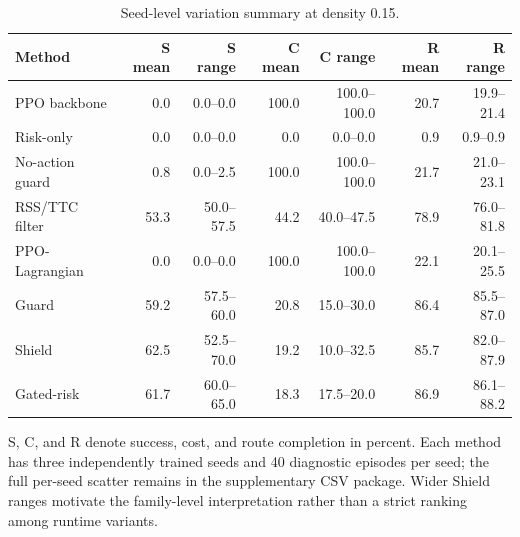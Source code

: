 \begin{table}[!htbp]
\centering
\caption{Seed-level variation summary at density 0.15.}
\label{tab_seed_range}
\scriptsize
\setlength{\tabcolsep}{3.0pt}
\renewcommand{\arraystretch}{1.08}
\begin{tabular}{@{}lrrrrrr@{}}
\toprule
Method & S mean & S range & C mean & C range & R mean & R range \\
\midrule
PPO backbone & 0.0 & 0.0--0.0 & 100.0 & 100.0--100.0 & 20.7 & 19.9--21.4 \\
Risk-only & 0.0 & 0.0--0.0 & 0.0 & 0.0--0.0 & 0.9 & 0.9--0.9 \\
No-action guard & 0.8 & 0.0--2.5 & 100.0 & 100.0--100.0 & 21.7 & 21.0--23.1 \\
RSS/TTC filter & 53.3 & 50.0--57.5 & 44.2 & 40.0--47.5 & 78.9 & 76.0--81.8 \\
PPO-Lagrangian & 0.0 & 0.0--0.0 & 100.0 & 100.0--100.0 & 22.1 & 20.1--25.5 \\
Guard & 59.2 & 57.5--60.0 & 20.8 & 15.0--30.0 & 86.4 & 85.5--87.0 \\
Shield & 62.5 & 52.5--70.0 & 19.2 & 10.0--32.5 & 85.7 & 82.0--87.9 \\
Gated-risk & 61.7 & 60.0--65.0 & 18.3 & 17.5--20.0 & 86.9 & 86.1--88.2 \\
\bottomrule
\end{tabular}
\begin{tablenotes}
\item S, C, and R denote success, cost, and route completion in percent. Each method has three independently trained seeds and 40 diagnostic episodes per seed; the full per-seed scatter remains in the supplementary CSV package. Wider Shield ranges motivate the family-level interpretation rather than a strict ranking among runtime variants.
\end{tablenotes}
\end{table}
